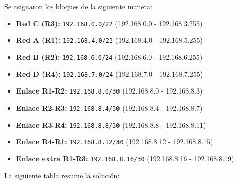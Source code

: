 \documentclass[a4paper,12pt]{article}
\begin{document}
Se asignaron los bloques de la siguiente manera:
\begin{itemize}
  \item \textbf{Red C (R3):} \texttt{192.168.0.0/22} \quad (192.168.0.0 - 192.168.3.255)
  \item \textbf{Red A (R1):} \texttt{192.168.4.0/23} \quad (192.168.4.0 - 192.168.5.255)
  \item \textbf{Red B (R2):} \texttt{192.168.6.0/24} \quad (192.168.6.0 - 192.168.6.255)
  \item \textbf{Red D (R4):} \texttt{192.168.7.0/24} \quad (192.168.7.0 - 192.168.7.255)
  \item \textbf{Enlace R1-R2:} \texttt{192.168.8.0/30} \quad (192.168.8.0 - 192.168.8.3)
  \item \textbf{Enlace R2-R3:} \texttt{192.168.8.4/30} \quad (192.168.8.4 - 192.168.8.7)
  \item \textbf{Enlace R3-R4:} \texttt{192.168.8.8/30} \quad (192.168.8.8 - 192.168.8.11)
  \item \textbf{Enlace R4-R1:} \texttt{192.168.8.12/30} \quad (192.168.8.12 - 192.168.8.15)
  \item \textbf{Enlace extra R1-R3:} \texttt{192.168.8.16/30} \quad (192.168.8.16 - 192.168.8.19)
\end{itemize}

La siguiente tabla resume la solución:
\end{document}

